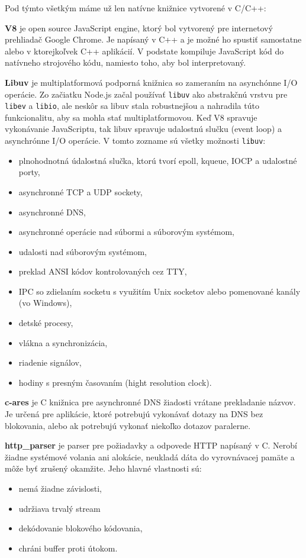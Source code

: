 \noindent Pod týmto všetkým máme už len natívne knižnice vytvorené v C/C++:

\textbf{V8} je open source JavaScript engine, ktorý bol vytvorený pre internetový prehliadač Google Chrome. Je napísaný v C++ a je možné ho spustiť samostatne alebo v ktorejkoľvek C++ aplikácií. V podstate kompiluje JavaScript kód do natívneho strojového kódu, namiesto toho, aby bol interpretovaný.

\textbf{Libuv} je multiplatformová podporná knižnica so zameraním na asynchónne I/O operácie. Zo začiatku Node.js začal používať \verb|libuv| ako abstrakčnú vrstvu pre \verb|libev| a \verb|libio|, ale neskôr sa libuv stala robustnejšou a nahradila túto funkcionalitu, aby sa mohla stať multiplatformovou. Keď V8 spravuje vykonávanie JavaScriptu, tak libuv spravuje udalostnú slučku (event loop) a asynchrónne I/O operácie. V tomto zozname sú všetky možnosti \verb|libuv|:
\begin{itemize}
\item plnohodnotná údalostná slučka, ktorú tvorí epoll, kqueue, IOCP a udalostné porty,
\item asynchronné TCP a UDP sockety,
\item asynchronné DNS,
\item asynchronné operácie nad súbormi a súborovým systémom,
\item udalosti nad súborovým systémom,
\item preklad ANSI kódov kontrolovaných cez TTY,
\item IPC so zdielaním socketu s využitím Unix socketov alebo pomenované kanály (vo Windows),
\item detské procesy,
\item vlákna a synchronizácia,
\item riadenie signálov,
\item hodiny s presným časovaním (hight resolution clock).
\end{itemize}

\textbf{c-ares} je C knižnica pre asynchronné DNS žiadosti vrátane prekladanie názvov. Je určená pre aplikácie, ktoré potrebujú vykonávať dotazy na DNS bez blokovania, alebo ak potrebujú vykonať niekoľko dotazov paralerne.

\textbf{http\_parser} je parser pre požiadavky a odpovede HTTP napísaný v C. Nerobí žiadne systémové volania ani alokácie, neukladá dáta do vyrovnávacej pamäte a môže byť zrušený okamžite. Jeho hlavné vlastnosti sú:
\begin{itemize}
\item nemá žiadne závislosti,
\item udržiava trvalý stream
\item dekódovanie blokového kódovania,
\item chráni buffer proti útokom.
\end{itemize}

